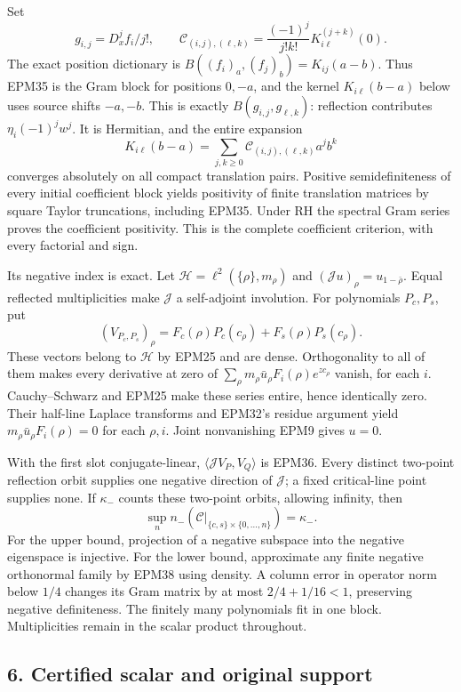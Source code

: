 \documentclass[
  10pt,
  a4paper,
]{article}
\begin{document}
Set \[
g_{i,j}=D_x^j f_i/j!,\qquad
\mathcal C_{(i,j),(\ell,k)}
=\frac{(-1)^j}{j!k!}K_{i\ell}^{(j+k)}(0).
\tag{EPM36}
\] The exact position dictionary is \(B((f_i)_a,(f_j)_b)=K_{ij}(a-b)\).
Thus EPM35 is the Gram block for positions \(0,-a\), and the kernel
\(K_{i\ell}(b-a)\) below uses source shifts \(-a,-b\). This is exactly
\(B(g_{i,j},g_{\ell,k})\): reflection contributes \(\eta_i(-1)^jw^j\).
It is Hermitian, and the entire expansion \[
K_{i\ell}(b-a)=\sum_{j,k\ge0}
\mathcal C_{(i,j),(\ell,k)}a^jb^k
\tag{EPM37}
\] converges absolutely on all compact translation pairs. Positive
semidefiniteness of every initial coefficient block yields positivity of
finite translation matrices by square Taylor truncations, including
EPM35. Under RH the spectral Gram series proves the coefficient
positivity. This is the complete coefficient criterion, with every
factorial and sign.

Its negative index is exact. Let \(\mathcal H=\ell^2(\{\rho\},m_\rho)\)
and \((\mathcal Ju)_\rho=u_{1-\bar\rho}\). Equal reflected
multiplicities make \(\mathcal J\) a self-adjoint involution. For
polynomials \(P_c,P_s\), put \[
(V_{P_c,P_s})_\rho=F_c(\rho)P_c(c_\rho)+F_s(\rho)P_s(c_\rho).
\tag{EPM38}
\] These vectors belong to \(\mathcal H\) by EPM25 and are dense.
Orthogonality to all of them makes every derivative at zero of
\(\sum_\rho m_\rho\bar u_\rho F_i(\rho)e^{zc_\rho}\) vanish, for each
\(i\). Cauchy--Schwarz and EPM25 make these series entire, hence
identically zero. Their half-line Laplace transforms and EPM32's residue
argument yield \(m_\rho\bar u_\rho F_i(\rho)=0\) for each \(\rho,i\).
Joint nonvanishing EPM9 gives \(u=0\).

With the first slot conjugate-linear,
\(\langle\mathcal J V_P,V_Q\rangle\) is EPM36. Every distinct two-point
reflection orbit supplies one negative direction of \(\mathcal J\); a
fixed critical-line point supplies none. If \(\kappa_-\) counts these
two-point orbits, allowing infinity, then \[
\sup_n n_-\left(\mathcal C|_{\{c,s\}\times\{0,\ldots,n\}}\right)=\kappa_-.
\tag{EPM39}
\] For the upper bound, projection of a negative subspace into the
negative eigenspace is injective. For the lower bound, approximate any
finite negative orthonormal family by EPM38 using density. A column
error in operator norm below \(1/4\) changes its Gram matrix by at most
\(2/4+1/16<1\), preserving negative definiteness. The finitely many
polynomials fit in one block. Multiplicities remain in the scalar
product throughout.

\subsection{6. Certified scalar and original
support}\label{certified-scalar-and-original-support}
\end{document}
